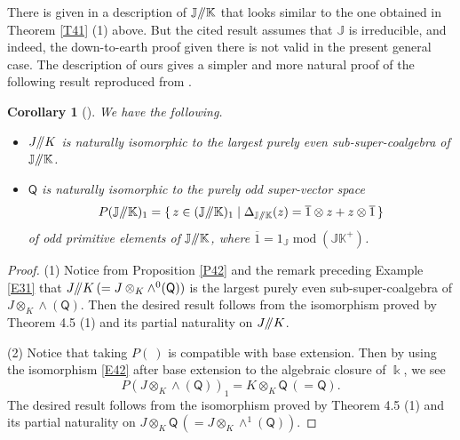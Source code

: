\documentclass[11pt, a4paper]{amsart}
\newtheorem{corollary}[theorem]{Corollary}
\theoremstyle{definition}
\newcommand\tu{\textup}
\numberwithin{equation}{section}
\begin{document}
There is given in \cite[Proposition 3.14 (1)]{M2}
a description of $\mathbb{J}/\hspace{-1mm}/\mathbb{K}$ that looks similar to the one obtained 
in Theorem \ref{T41} (1) above.
But the cited result assumes that $\mathbb{J}$ is irreducible, and indeed, 
the down-to-earth proof given there is not 
valid in the present general case. 
The description of ours gives a simpler and more natural proof of the following result reproduced from \cite{M2}.

\begin{corollary}[\tu{\cite[Theorem 3.13 (2), (3)]{M2}}]\label{C41}
We have the following.
\begin{itemize}
\item[(1)]
$J/\hspace{-1mm}/K$ is naturally isomorphic to the largest purely even sub-super-coalgebra 
of $\mathbb{J}/\hspace{-1mm}/\mathbb{K}$.
\item[(2)]
$\mathsf{Q}$ is naturally isomorphic to the purely odd super-vector space
\[
P(\mathbb{J}/\hspace{-1mm}/\mathbb{K})_1 =\{\, z \in (\mathbb{J}/\hspace{-1mm}/\mathbb{K})_1 \mid 
\Delta_{\mathbb{J}/\hspace{-1mm}/\mathbb{K}}(z)=\overline{1}\otimes z + z \otimes \overline{1}\, \}
\]
of odd primitive elements of $\mathbb{J}/\hspace{-1mm}/\mathbb{K}$, where $\overline{1}=1_{\mathbb{J}}\operatorname{mod}(\mathbb{J}\mathbb{K}^+)$. 
\end{itemize}
\end{corollary}
\begin{proof}
(1) 
Notice from Proposition \ref{P42} and the remark preceding Example \ref{E31} that 
$J /\hspace{-1mm}/ K\, (=J\otimes_K \wedge^0(\mathsf{Q}))$ is the largest purely even sub-super-coalgebra of $J\otimes_K\wedge(\mathsf{Q})$. Then the desired result follows from 
the isomorphism proved by Theorem 4.5 (1) and its partial naturality on $J /\hspace{-1mm}/ K$.

(2)
Notice that taking $P(\ )$ is compatible with base extension. Then by using the isomorphism
\eqref{E42} after base extension to the algebraic closure of $\Bbbk$, we see
\[ P(J\otimes_K\wedge(\mathsf{Q}))_1= K\otimes_K \mathsf{Q}\, (=\mathsf{Q}). \]
The desired result follows from 
the isomorphism proved by Theorem 4.5 (1) and its partial naturality on 
$J \otimes_K \mathsf{Q}\, (=J\otimes_K \wedge^1(\mathsf{Q}))$. 
\end{proof}
\end{document}
